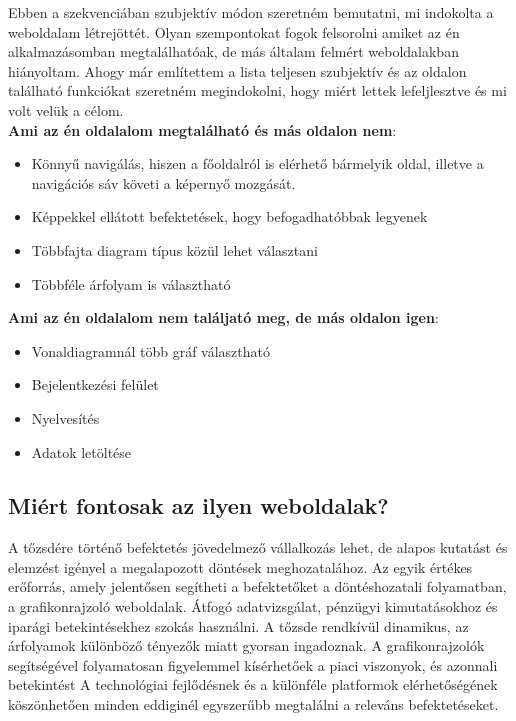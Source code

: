 Ebben a szekvenciában szubjektív módon szeretném bemutatni, mi indokolta a weboldalam létrejöttét. Olyan szempontokat fogok felsorolni amiket az én alkalmazásomban megtalálhatóak, de más általam felmért weboldalakban hiányoltam. Ahogy már említettem a lista teljesen szubjektív és az oldalon található funkciókat szeretném megindokolni, hogy miért lettek lefeljlesztve és mi volt velük a célom. \\

\textbf{Ami az én oldalalom megtalálható és más oldalon nem}:

\begin{itemize}
\item Könnyű navigálás, hiszen a főoldalról is elérhető bármelyik oldal, illetve a navigációs sáv követi a képernyő mozgását. 
\item Képpekkel ellátott befektetések, hogy befogadhatóbbak legyenek
\item Többfajta diagram típus közül lehet választani
\item Többféle árfolyam is választható
\end{itemize}

\textbf{Ami az én oldalalom nem találjató meg, de más oldalon igen}:

\begin{itemize}
\item Vonaldiagramnál több gráf választható
\item Bejelentkezési felület
\item Nyelvesítés
\item Adatok letöltése
\end{itemize}

\subsection {Miért fontosak az ilyen weboldalak?}

A tőzsdére történő befektetés jövedelmező vállalkozás lehet, de alapos kutatást és elemzést igényel a megalapozott döntések meghozatalához. Az egyik értékes erőforrás, amely jelentősen segítheti a befektetőket a döntéshozatali folyamatban, a grafikonrajzoló weboldalak. Átfogó adatvizsgálat, pénzügyi kimutatásokhoz és iparági betekintésekhez szokás használni. A tőzsde rendkívül dinamikus, az árfolyamok különböző tényezők miatt gyorsan ingadoznak. A grafikonrajzolók segítségével folyamatosan figyelemmel kísérhetőek a piaci viszonyok, és azonnali betekintést 
A technológiai fejlődésnek és a különféle platformok elérhetőségének köszönhetően minden eddiginél egyszerűbb megtalálni a releváns befektetéseket.

